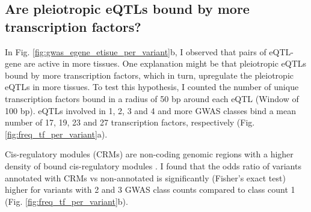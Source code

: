 %
%

\subsection*{Are pleiotropic eQTLs bound by more transcription factors?}

In Fig. \ref{fig:gwas_egene_etisue_per_variant}b, I observed that pairs of eQTL-gene are active in more tissues.
%
One explanation might be that pleiotropic eQTLs bound by more transcription factors, which in turn, upregulate the pleiotropic eQTLs in more tissues.
%
To test this hypothesis, I counted the number of unique transcription factors bound in a radius of 50 bp around each eQTL (Window of 100 bp).
%
eQTLs involved in 1, 2, 3 and 4 and more GWAS classes bind a mean number of 17,
19, 23 and 27 transcription factors, respectively (Fig. \ref{fig:freq_tf_per_variant}a).

Cis-regulatory modules (CRMs) are non-coding genomic regions with a higher density of bound cis-regulatory modules \citep{2021.Ballester.Hammal}.
%
I found that the odds ratio of variants annotated with CRMs vs non-annotated is significantly (Fisher's exact test) higher for variants with 2 and 3 GWAS class counts compared to class count 1 (Fig. \ref{fig:freq_tf_per_variant}b).

